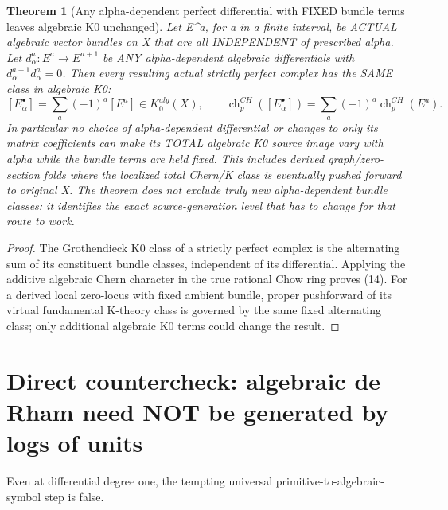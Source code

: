 \documentclass[11pt]{article}
\newtheorem{theorem}{Theorem}[section]
\begin{document}
\begin{theorem}[Any alpha-dependent perfect differential with FIXED bundle terms leaves algebraic K0 unchanged]
Let E^a, for a in a finite interval, be ACTUAL
algebraic vector bundles on X that are all
INDEPENDENT of prescribed alpha. Let
$d^a_\alpha:E^a\to E^{a+1}$
be ANY alpha-dependent algebraic differentials
with $d^{a+1}_\alpha d^a_\alpha=0$.
Then every resulting actual strictly perfect complex
has the SAME class in algebraic K0:
\[
 \boxed{
 [E^\bullet_\alpha]
    =\sum_a(-1)^a[E^a]\in K_0^{alg}(X),
 \qquad
 \operatorname{ch}_p^{CH}([E^\bullet_\alpha])
    =\sum_a(-1)^a\operatorname{ch}_p^{CH}(E^a).
 }                                                       \tag{14}
\]
In particular no choice of alpha-dependent
differential or changes to only its matrix coefficients
can make its TOTAL algebraic K0 source image vary
with alpha while the bundle terms are held fixed.
This includes derived graph/zero-section folds
where the localized total Chern/K class
is eventually pushed forward to original X.
The theorem does not exclude truly new
alpha-dependent bundle classes: it identifies
the exact source-generation level that has
to change for that route to work.
\end{theorem}
\begin{proof}
The Grothendieck K0 class of a strictly perfect
complex is the alternating sum of its constituent
bundle classes, independent of its differential.
Applying the additive algebraic Chern character
in the true rational Chow ring proves (14).
For a derived local zero-locus with fixed ambient
bundle, proper pushforward of its virtual
fundamental K-theory class is governed by the
same fixed alternating class; only additional
algebraic K0 terms could change the result.
\end{proof}

\section{Direct countercheck: algebraic de Rham need NOT be generated by logs of units}
Even at differential degree one, the tempting
universal primitive-to-algebraic-symbol step is false.
\end{document}
